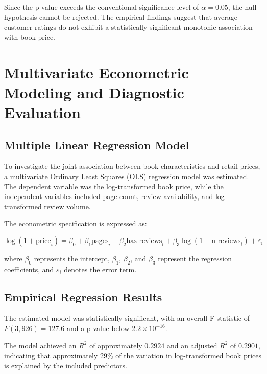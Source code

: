 \documentclass[11pt,a4paper]{article}
\begin{document}
Since the p-value exceeds the conventional significance level of $\alpha = 0.05$, the null hypothesis cannot be rejected. The empirical findings suggest that average customer ratings do not exhibit a statistically significant monotonic association with book price.


\newpage
\section{Multivariate Econometric Modeling and Diagnostic Evaluation}

\subsection{Multiple Linear Regression Model}

To investigate the joint association between book characteristics and retail prices, a multivariate Ordinary Least Squares (OLS) regression model was estimated. The dependent variable was the log-transformed book price, while the independent variables included page count, review availability, and log-transformed review volume.

The econometric specification is expressed as:

\begin{equation}
\log(1+\text{price}_i)
=
\beta_0
+
\beta_1\text{pages}_i
+
\beta_2\text{has\_reviews}_i
+
\beta_3\log(1+\text{n\_reviews}_i)
+
\varepsilon_i
\end{equation}

where $\beta_0$ represents the intercept, $\beta_1$, $\beta_2$, and $\beta_3$ represent the regression coefficients, and $\varepsilon_i$ denotes the error term.

\subsection{Empirical Regression Results}

The estimated model was statistically significant, with an overall F-statistic of $F(3,926)=127.6$ and a p-value below $2.2 \times 10^{-16}$.

The model achieved an $R^2$ of approximately $0.2924$ and an adjusted $R^2$ of $0.2901$, indicating that approximately 29\% of the variation in log-transformed book prices is explained by the included predictors.
\end{document}
